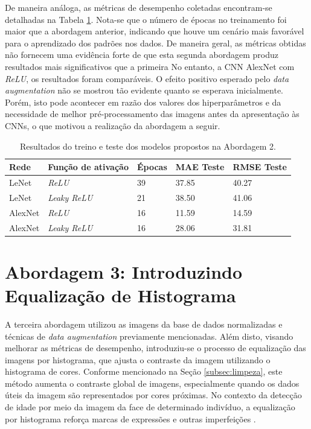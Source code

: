 	De maneira análoga, as métricas de desempenho coletadas encontram-se detalhadas na Tabela \ref{tab:results2}. Nota-se que o número de épocas no treinamento foi maior que a abordagem anterior, indicando que houve um cenário mais favorável para o aprendizado dos padrões nos dados. De maneira geral, as métricas obtidas não fornecem uma evidência forte de que esta segunda abordagem produz resultados mais significativos que a primeira No entanto, a CNN AlexNet com \emph{ReLU}, os resultados foram comparáveis. O efeito positivo esperado pelo \emph{data augmentation} não se mostrou tão evidente quanto se esperava inicialmente. Porém, isto pode acontecer em razão dos valores dos hiperparâmetros e da necessidade de melhor pré-processamento das imagens antes da apresentação às CNNs, o que motivou a realização da abordagem a seguir.

	\begin{table}[!hb]
		\caption{Resultados do treino e teste dos modelos propostos na Abordagem 2.}
		\label{tab:results2}
		\begin{center}
			\begin{tabular}{l l l l l}
				\toprule
				Rede & Função de ativação & Épocas & MAE Teste & RMSE Teste \\
				\midrule
				LeNet & \emph{ReLU}  & 39 & 37.85 & 40.27 \\
				LeNet & \emph{Leaky ReLU} & 21 & 38.50 & 41.06 \\
				AlexNet & \emph{ReLU}  & 16 & 11.59 & 14.59 \\
				AlexNet & \emph{Leaky ReLU} & 16 & 28.06 & 31.81 \\
				\bottomrule
			\end{tabular}
		\end{center}
	\end{table}



\section{Abordagem 3: Introduzindo Equalização de Histograma}%
	A terceira abordagem utilizou as imagens da base de dados normalizadas e técnicas de \emph{data augmentation} previamente mencionadas. Além disto, visando melhorar as métricas de desempenho, introduziu-se o processo de equalização das imagens por histograma, que ajusta o contraste da imagem utilizando o histograma de cores. Conforme mencionado na Seção \ref{subsec:limpeza}, este método aumenta o contraste global de imagens, especialmente quando os dados úteis da imagem são representados por cores próximas. No contexto da detecção de idade por meio da imagem da face de determinado indivíduo, a equalização por histograma reforça marcas de expressões e outras imperfeições \cite{acharya2005image}.

